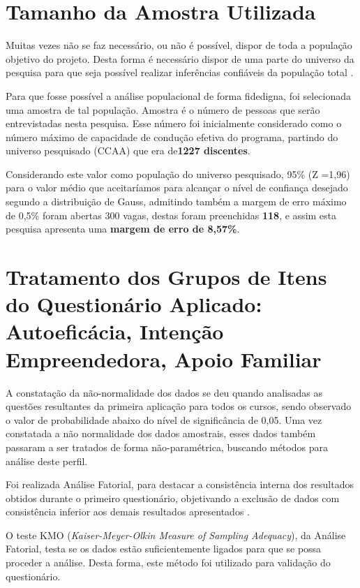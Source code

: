 \section{Tamanho da Amostra Utilizada}

Muitas vezes não se faz necessário, ou não é possível, dispor de toda a população objetivo do projeto. Desta forma é necessário dispor de uma parte do universo da pesquisa para que seja possível realizar inferências confiáveis da população total \cite{marino_manual_2003}.

Para que fosse possível a análise populacional de forma fidedigna, foi selecionada uma amostra de tal população. Amostra é o número de pessoas que serão entrevistadas nesta pesquisa. Esse número foi inicialmente considerado como o número máximo de capacidade de condução efetiva do programa, partindo do universo pesquisado (CCAA) que era de\textbf{1227 discentes}.


Considerando este valor como população do universo pesquisado, 95\% (Z =1,96) para o valor médio que aceitaríamos para alcançar o nível de confiança desejado segundo a distribuição de Gauss, admitindo também a margem de erro máximo de 0,5\% foram abertas 300 vagas, destas foram preenchidas \textbf{118}, e assim esta pesquisa apresenta uma \textbf{margem de erro de 8,57\%}.

\section{Tratamento dos Grupos de Itens do Questionário Aplicado: Autoeficácia, Intenção Empreendedora, Apoio Familiar}

A constatação da não-normalidade dos dados se deu quando analisadas as questões resultantes da primeira aplicação para todos os cursos, sendo observado o valor de probabilidade abaixo do nível de significância de 0,05. Uma vez constatada a não normalidade dos dados amostrais, esses dados também passaram a ser tratados de forma não-paramétrica, buscando métodos para análise deste perfil.

Foi realizada Análise Fatorial, para destacar a consistência interna dos resultados obtidos durante o primeiro questionário, objetivando a exclusão de dados com consistência inferior aos demais resultados apresentados .

O teste KMO (\textit{Kaiser-Meyer-Olkin Measure of Sampling Adequacy}), da Análise Fatorial, testa se os dados estão suficientemente ligados para que se possa proceder a análise. Desta forma, este método foi utilizado para validação do questionário.

